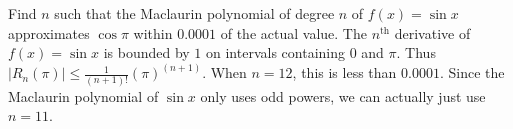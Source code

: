 {Find $n$ such that the  Maclaurin polynomial of degree $n$ of $f(x)= \sin x$ approximates $\cos \pi$ within $0.0001$ of the actual value.
}
{The $n^\text{th}$ derivative of $f(x)=\sin x$ is bounded by $1$ on intervals containing $0$ and $\pi$. Thus $|R_n(\pi)|\leq \frac{1}{(n+1)!}(\pi)^{(n+1)}$. When $n=12$, this is less than $0.0001$. Since the Maclaurin polynomial of $\sin x$ only uses odd powers, we can actually just use $n=11$.
}